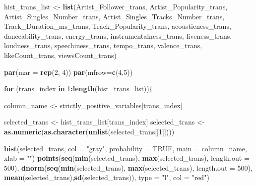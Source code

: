 \documentclass[
]{article}
\newenvironment{Shaded}{\begin{snugshade}}{\end{snugshade}}
\newcommand{\ControlFlowTok}[1]{\textcolor[rgb]{0.13,0.29,0.53}{\textbf{#1}}}
\newcommand{\DataTypeTok}[1]{\textcolor[rgb]{0.13,0.29,0.53}{#1}}
\newcommand{\DecValTok}[1]{\textcolor[rgb]{0.00,0.00,0.81}{#1}}
\newcommand{\KeywordTok}[1]{\textcolor[rgb]{0.13,0.29,0.53}{\textbf{#1}}}
\newcommand{\NormalTok}[1]{#1}
\newcommand{\OperatorTok}[1]{\textcolor[rgb]{0.81,0.36,0.00}{\textbf{#1}}}
\newcommand{\OtherTok}[1]{\textcolor[rgb]{0.56,0.35,0.01}{#1}}
\newcommand{\StringTok}[1]{\textcolor[rgb]{0.31,0.60,0.02}{#1}}
\begin{document}
\begin{Shaded}
\begin{Highlighting}[]
\NormalTok{hist_trans_list <-}\StringTok{ }\KeywordTok{list}\NormalTok{(Artist_Follower_trans, }
\NormalTok{                        Artist_Popularity_trans,}
\NormalTok{                        Artist_Singles_Number_trans,}
\NormalTok{                        Artist_Singles_Tracks_Number_trans,}
\NormalTok{                        Track_Duration_ms_trans, }
\NormalTok{                        Track_Popularity_trans,}
\NormalTok{                     acousticness_trans, }
\NormalTok{                     danceability_trans, }
\NormalTok{                     energy_trans, }
\NormalTok{                     instrumentalness_trans,}
\NormalTok{                     liveness_trans, }
\NormalTok{                     loudness_trans, }
\NormalTok{                     speechiness_trans, }
\NormalTok{                     tempo_trans, }
\NormalTok{                     valence_trans,}
\NormalTok{                     likeCount_trans,}
\NormalTok{                     viewsCount_trans)}

\KeywordTok{par}\NormalTok{(}\DataTypeTok{mar =} \KeywordTok{rep}\NormalTok{(}\DecValTok{2}\NormalTok{, }\DecValTok{4}\NormalTok{))}
\KeywordTok{par}\NormalTok{(}\DataTypeTok{mfrow=}\KeywordTok{c}\NormalTok{(}\DecValTok{4}\NormalTok{,}\DecValTok{5}\NormalTok{))}

\ControlFlowTok{for}\NormalTok{ (trans_index }\ControlFlowTok{in} \DecValTok{1}\OperatorTok{:}\KeywordTok{length}\NormalTok{(hist_trans_list))\{}
  
\NormalTok{  column_name <-}\StringTok{ }\NormalTok{strictly_positive_variables[trans_index]}
  
\NormalTok{  selected_trans <-}\StringTok{ }\NormalTok{hist_trans_list[trans_index]}
\NormalTok{  selected_trans <-}\StringTok{ }\KeywordTok{as.numeric}\NormalTok{(}\KeywordTok{as.character}\NormalTok{(}\KeywordTok{unlist}\NormalTok{(selected_trans[[}\DecValTok{1}\NormalTok{]])))}
  
  \KeywordTok{hist}\NormalTok{(selected_trans, }\DataTypeTok{col =} \StringTok{"gray"}\NormalTok{, }\DataTypeTok{probability =} \OtherTok{TRUE}\NormalTok{, }\DataTypeTok{main =}\NormalTok{ column_name, }\DataTypeTok{xlab =} \StringTok{""}\NormalTok{)}
  \KeywordTok{points}\NormalTok{(}\KeywordTok{seq}\NormalTok{(}\KeywordTok{min}\NormalTok{(selected_trans), }\KeywordTok{max}\NormalTok{(selected_trans), }\DataTypeTok{length.out =} \DecValTok{500}\NormalTok{),}
       \KeywordTok{dnorm}\NormalTok{(}\KeywordTok{seq}\NormalTok{(}\KeywordTok{min}\NormalTok{(selected_trans), }\KeywordTok{max}\NormalTok{(selected_trans), }\DataTypeTok{length.out =} \DecValTok{500}\NormalTok{),}
             \KeywordTok{mean}\NormalTok{(selected_trans),}\KeywordTok{sd}\NormalTok{(selected_trans)), }\DataTypeTok{type =} \StringTok{"l"}\NormalTok{, }\DataTypeTok{col =} \StringTok{"red"}\NormalTok{)}
  

\end{Highlighting}
\end{Shaded}
\end{document}
